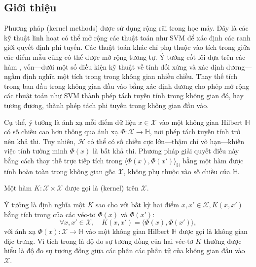 \subsection{Giới thiệu}

Phương pháp  (kernel methods) được sử dụng rộng rãi trong học máy.
Đây là các kỹ thuật linh hoạt có thể mở rộng các thuật toán như SVM để xác
định các ranh giới quyết định phi tuyến. Các thuật toán khác chỉ phụ thuộc vào
tích trong giữa các điểm mẫu cũng có thể được mở rộng tương tự. Ý tưởng cốt
lõi dựa trên các hàm , vốn---dưới một số điều kiện kỹ thuật về
tính đối xứng và xác định dương---ngầm định nghĩa một tích trong trong không
gian nhiều chiều. Thay thế tích trong ban đầu trong không gian đầu vào bằng
 xác định dương cho phép mở rộng các thuật toán như SVM thành phép
tách tuyến tính trong không gian đó, hay tương đương, thành phép tách phi tuyến
trong không gian đầu vào.

Cụ thể, ý tưởng là ánh xạ mỗi điểm dữ liệu $x \in \mathcal{X}$ vào một không
gian Hilbert $\mathbb{H}$ có số chiều cao hơn thông qua ánh xạ $\Phi \colon
\mathcal{X} \to \mathbb{H}$, nơi phép tách tuyến tính trở nên khả thi. Tuy
nhiên, $\mathcal{H}$ có thể có số chiều cực lớn---thậm chí vô hạn---khiến
việc tính tường minh $\Phi(x)$ là bất khả thi. Phương pháp  giải quyết
điều này bằng cách thay thế trực tiếp tích trong $\langle \Phi(x), \Phi(x')
\rangle_{\mathbb{H}}$ bằng một hàm  được tính hoàn toàn trong không
gian gốc $\mathcal{X}$, không phụ thuộc vào số chiều của $\mathbb{H}$.

\begin{defn}[\tr{Kernel}]
  Một hàm $K\colon \mathcal{X} \times \mathcal{X}$ được gọi là 
  (kernel) trên $\mathcal{X}$.

  Ý tưởng là định nghĩa một  $K$ sao cho với bất kỳ hai điểm
  $x, x'\in \mathcal{X}, K(x, x')$ bằng tích trong của các véc-tơ $\Phi(x)$
  và $\Phi(x')$:
  \begin{equation}
    \forall x, x' \in \mathcal{X}, \quad K(x, x') = \bigl\langle \Phi(x),
    \Phi(x') \bigr\rangle,
  \end{equation}
  với ánh xạ $\Phi(x)\colon \mathcal{X} \to \mathbb{H}$ vào một không gian
  Hilbert $\mathbb{H}$ được gọi là không gian đặc trưng. Vì tích trong là độ
  đo sự tương đồng của hai véc-tơ $K$ thường được hiểu là độ đo sự tương đồng
  giữa các phần các phần tử của không gian đầu vào $\mathcal{X}$.
\end{defn}\


